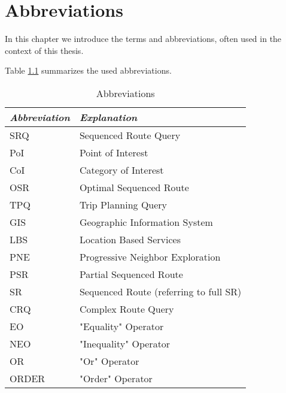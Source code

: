 \chapter{Abbreviations}
In this chapter we introduce the terms and abbreviations, often used in the context of this thesis.

Table \ref{abbr} summarizes the used abbreviations.

\begin{table}[h!]
	\centering
	\begin{tabular}{ |l|l| } 
		\hline
		\textit{Abbreviation} & \textit{Explanation} \\
		\hline
		SRQ & Sequenced Route Query \\ 

		PoI & Point of Interest \\ 
		
		CoI & Category of Interest \\ 

		OSR & Optimal Sequenced Route \\
		
		TPQ & Trip Planning Query \\
		
		GIS & Geographic Information System \\
		
		LBS & Location Based Services \\

		PNE & Progressive Neighbor Exploration \cite{OSR} \\ 

		PSR & Partial Sequenced Route \\ 

		SR & Sequenced Route (referring to full SR)\\
		
		CRQ & Complex Route Query \\
		
		EO & "Equality" Operator \\
		
		NEO & "Inequality" Operator \\
		
		OR & "Or" Operator \\
		
		ORDER & "Order" Operator \\
		\hline
	\end{tabular}
	\caption{Abbreviations}
	\label{abbr}
\end{table}